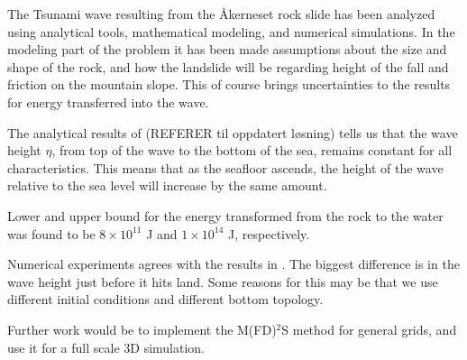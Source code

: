 \documentclass[11pt]{article}
\begin{document}
The Tsunami wave resulting from the Åkerneset rock slide has been analyzed using analytical tools, mathematical modeling, and numerical simulations. In the modeling part of the problem it has been made assumptions about the size and shape of the rock, and how the landslide will be regarding height of the fall and friction on the mountain slope. This of course brings uncertainties to the results for energy transferred into the wave. 

The analytical results of (REFERER til oppdatert løsning) tells us that the wave height $\eta$, from top of the wave to the bottom of the sea, remains constant for all characteristics. This means that as the seafloor ascends, the height of the wave relative to the sea level will increase by the same amount.

Lower and upper bound for the energy transformed from the rock to the water was found to be $8\times 10^{11}$ J and $1\times 10^{14}$ J, respectively. 

Numerical experiments agrees with the results in \citep{harbitz14}. The biggest difference is in the wave height just before it hits land. Some reasons for this may be that we use different initial conditions and different 
bottom topology.

Further work would be to implement the M(FD)$^2$S method for general grids, and use it for a full scale 3D simulation.


\clearpage
{}

  
\end{document}
